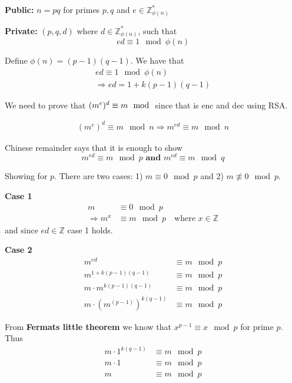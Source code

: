 
\textbf{Public:} $n = pq$ for primes $p, q$ and $e \in \mathbb{Z}_{\phi(n)}^*$

\textbf{Private:} $(p, q, d)$ where $d \in \mathbb{Z}_{\phi(n)}^*$, such that
\[ ed \equiv 1 \mod \phi(n) \]

Define $\phi(n) = (p-1)(q-1)$. We have that
\begin{align*}
  ed \equiv 1 \mod \phi(n)\\
  \Rightarrow ed = 1 + k(p - 1)(q - 1)
\end{align*}

We need to prove that $(m^e)^d \equiv m \mod$ since that is enc and dec using RSA.


\begin{align*}
(m^e)^d \equiv m \mod n
\Rightarrow m^{ed} \equiv m \mod n
\end{align*}

Chinese remainder says that it is enough to show
\[ m^{ed} \equiv m \mod p \textbf{ and } m^{ed} \equiv m \mod q \]

Showing for $p$. There are two cases: 1) $m \equiv 0 \mod p$ and 2) $m \not\equiv 0 \mod p$.

\textbf{Case 1}
\begin{align*}
m &\equiv 0 \mod p\\
\Rightarrow m^x &\equiv m \mod p \quad \text{where } x \in \mathbb{Z}
\end{align*}
and since $ed \in \mathbb{Z}$ case 1 holds.

\textbf{Case 2}
\begin{align*}
m^{ed} &\equiv m \mod p\\
m^{1 + k(p-1)(q-1)} &\equiv m \mod p\\
m \cdot m^{k(p-1)(q-1)} &\equiv m \mod p\\
m \cdot (m^{(p-1)})^{k(q-1)} &\equiv m \mod p
\end{align*}

From \textbf{Fermats little theorem} we know that $x^{p-1} \equiv x \mod p$ for prime $p$. Thus
\begin{align*}
m \cdot 1^{k(q-1)} &\equiv m \mod p\\
m \cdot 1 &\equiv m \mod p\\
m &\equiv m \mod p
\end{align*}
